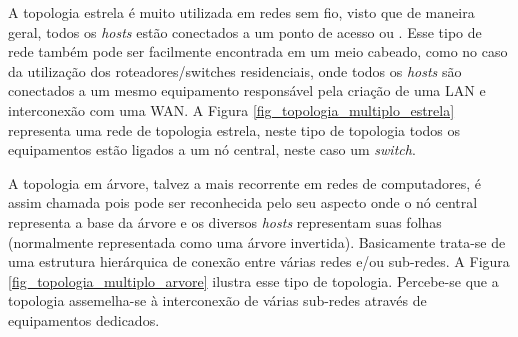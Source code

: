 
A topologia estrela é muito utilizada em redes sem fio, visto que de maneira geral, todos os \emph{hosts} estão conectados a um ponto de acesso ou . Esse tipo de rede também pode ser facilmente encontrada em um meio cabeado, como no caso da utilização dos roteadores/switches residenciais, onde todos os \emph{hosts} são conectados a um mesmo equipamento responsável pela criação de uma LAN e interconexão com uma WAN. A Figura \ref{fig_topologia_multiplo_estrela} representa uma rede de topologia estrela, neste tipo de topologia todos os equipamentos estão ligados a um nó central, neste caso um \emph{switch}.


A topologia em árvore, talvez a mais recorrente em redes de computadores, é assim chamada pois pode ser reconhecida pelo seu aspecto onde o nó central representa a base da árvore e os diversos \emph{hosts} representam suas folhas (normalmente representada como uma árvore invertida). Basicamente trata-se de uma estrutura hierárquica de conexão entre várias redes e/ou sub-redes. A Figura \ref{fig_topologia_multiplo_arvore} ilustra esse tipo de topologia. Percebe-se que a topologia assemelha-se à interconexão de várias sub-redes através de equipamentos dedicados.


